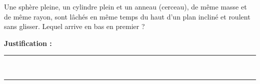 Une sphère pleine, un cylindre plein et un anneau (cerceau), de même masse et de même rayon, sont lâchés en même temps du haut d'un plan incliné et roulent sans glisser. Lequel arrive en bas en premier ?

\choices

\noindent\textbf{Justification :} \hrulefill \\[2.5ex]
\rule{\linewidth}{0.4pt} \\[2.5ex]
\rule{\linewidth}{0.4pt}
\vfill

